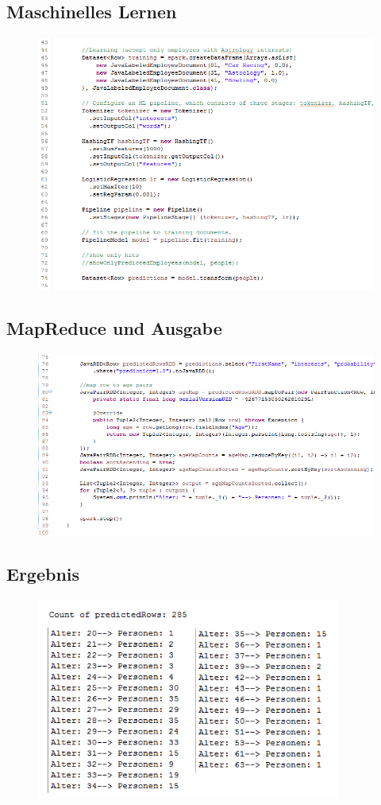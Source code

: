 \subsection{Maschinelles Lernen}\label{code:verbund_2}
\begin{figure}[ht]
  \centering
  \includegraphics[width=140mm]{./bilder/code_verbund_2.PNG}  
\end{figure}

\newpage
\subsection{MapReduce und Ausgabe}\label{code:verbund_3}
\begin{figure}[h]
  \centering
  \includegraphics[width=140mm]{./bilder/code_verbund_3.PNG}  
\end{figure}

\subsection{Ergebnis}\label{code:verbund_4}
\begin{figure}[h]
  \centering
  \includegraphics[width=100mm]{./bilder/code_verbund_4.PNG}  
\end{figure}